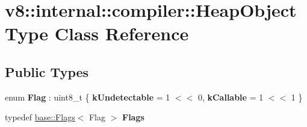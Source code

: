 \hypertarget{classv8_1_1internal_1_1compiler_1_1HeapObjectType}{}\section{v8\+:\+:internal\+:\+:compiler\+:\+:Heap\+Object\+Type Class Reference}
\label{classv8_1_1internal_1_1compiler_1_1HeapObjectType}
\subsection*{Public Types}
\begin{DoxyCompactItemize}
\item 
\mbox{\label{classv8_1_1internal_1_1compiler_1_1HeapObjectType_a42d81b6cf7a086e76b28e2ec51193572}} 
enum {\bfseries Flag} \+: uint8\+\_\+t \{ {\bfseries k\+Undetectable} = 1 $<$$<$ 0, 
{\bfseries k\+Callable} = 1 $<$$<$ 1
 \}
\item 
\mbox{\label{classv8_1_1internal_1_1compiler_1_1HeapObjectType_a7ffe1abb323a95ab8d85025e35dac53d}} 
typedef \mbox{\hyperlink{classv8_1_1base_1_1Flags}{base\+::\+Flags}}$<$ Flag $>$ {\bfseries Flags}
\end{DoxyCompactItemize}

